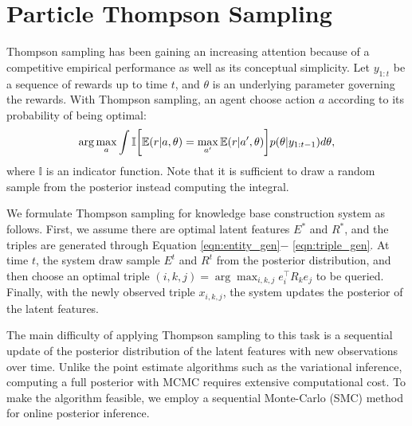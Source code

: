 \section{Particle Thompson Sampling}

Thompson sampling has been gaining an increasing attention 
because of a competitive empirical performance as well as its conceptual 
simplicity. Let $y_{1:t}$ be a sequence of rewards up to time $t$, and $\theta$ is an underlying parameter governing the rewards. With Thompson sampling, an agent choose action $a$ according to its probability of being optimal:
\begin{align}
\arg\max_a \int \mathbb{I}\bigg[ \mathbb{E}(r|a, \theta) 
= \max_{a'}\mathbb{E}(r|a',\theta) \bigg] p(\theta|y_{1:t-1}) d\theta, \notag
\end{align}
where $\mathbb{I}$ is an indicator function. Note that it is sufficient 
to draw a random sample from the posterior instead computing the integral.

We formulate Thompson sampling for knowledge base construction
system as follows. 
First, we assume there are optimal latent features $E^*$ and $R^*$, and 
the triples are generated through Equation \ref{eqn:entity_gen}$-$
\ref{eqn:triple_gen}. At time $t$, the system draw sample $E^t$ and $R^t$ 
from the posterior distribution, and then choose an optimal triple $(i,k,j) 
= \arg\max_{i,k,j} e_i^\top R_k e_j$ to be queried. Finally, with the newly
observed triple $x_{i,k,j}$, the system updates the posterior of the latent 
features.

The main difficulty of applying Thompson sampling to this task is a sequential update of the posterior distribution of the latent features with new observations over time. Unlike the point estimate algorithms such as
the variational inference, computing a full posterior with MCMC 
requires extensive computational cost. To make the algorithm feasible, we employ a sequential Monte-Carlo (SMC) method for online posterior inference.

